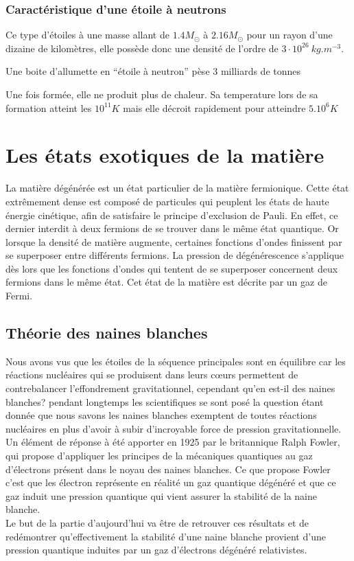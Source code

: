 \documentclass[11pt]{book} %
\begin{document}
\subsection{Caractéristique d'une étoile à neutrons}\label{neutron}
Ce type d'étoiles à une masse allant de \(1.4M_\odot\) à \(2.16M_\odot\) pour un rayon d'une dizaine de kilomètres, elle possède donc une densité de l'ordre de \(3\cdot 10^{26}\ kg.m^{-3}\).
\begin{remark}
    Une boite d'allumette en ``étoile à neutron'' pèse 3 milliards de tonnes
\end{remark}
Une fois formée, elle ne produit plus de chaleur. Sa temperature lors de sa formation atteint les \(10^{11}K\) mais elle décroit rapidement pour atteindre \(5.10^6K\)

\chapter{Les états exotiques de la matière}

La matière dégénérée est un état particulier de la matière fermionique. Cette état extrêmement dense est composé de particules qui peuplent les états de haute énergie cinétique, afin de satisfaire le principe d'exclusion de Pauli. En effet, ce dernier interdit à deux fermions de se trouver dans le même état quantique. Or lorsque la densité de matière augmente, certaines fonctions d'ondes finissent par se superposer entre différents fermions. La pression de dégénérescence s'applique dès lors que les fonctions d'ondes qui tentent de se superposer concernent deux fermions dans le même état. Cet état de la matière est décrite par un gaz de Fermi.

\section{Théorie des naines blanches}
Nous avons vus que les étoiles de la séquence principales sont en équilibre car les réactions nucléaires qui se produisent dans leurs cœurs permettent de contrebalancer l'effondrement gravitationnel, cependant qu'en est-il des naines blanches? pendant longtemps les scientifiques se sont posé la question étant donnée que nous savons les naines blanches exemptent de toutes réactions nucléaires en plus d'avoir à subir d'incroyable force de pression gravitationnelle.\\
Un élément de réponse à été apporter en 1925 par le britannique Ralph Fowler, qui propose d'appliquer les principes de la mécaniques quantiques au gaz d'électrons présent dans le noyau des naines blanches. Ce que propose Fowler c'est que les électron représente en réalité un gaz quantique dégénéré et que ce gaz induit une pression quantique qui vient assurer la stabilité de la naine blanche.\\
Le but de la partie d'aujourd'hui va être de retrouver ces résultats et de redémontrer qu'effectivement la stabilité d'une naine blanche provient d'une pression quantique induites par un gaz d'électrons dégénéré relativistes.
\end{document}
